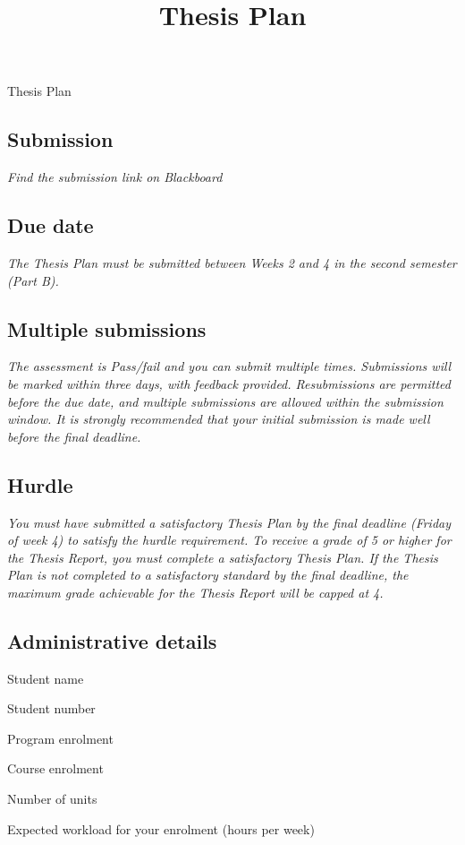 \documentclass[12pt,openany,a4paper]{book}
\newcommand{\purple}[1]{\textcolor{topicpurple}{\textit{#1}}}
\newcommand{\field}[1]{\noindent #1\par\vspace{1.2em}}
\begin{document}
\setlength{\parindent}{0pt}
\setlength{\parskip}{0.6em}

\title{Thesis Plan}
\date{}
\begingroup
{}
\setlength{\parindent}{0pt}
\setlength{\parskip}{0.5em}
\vspace*{-2.5em}
\begin{center}
{\LARGE Thesis Plan}
\end{center}
\vspace{-1.2em}
\endgroup


\subsection*{Submission}
\purple{Find the submission link on Blackboard}

\subsection*{Due date}
\purple{The Thesis Plan must be submitted between Weeks 2 and 4 in the second semester (Part B).}

\subsection*{Multiple submissions}
\purple{The assessment is Pass/fail and you can submit multiple times. Submissions will be marked within three days, with feedback provided. Resubmissions are permitted before the due date, and multiple submissions are allowed within the submission window. It is strongly recommended that your initial submission is made well before the final deadline.}

\subsection*{Hurdle}
\purple{You must have submitted a satisfactory Thesis Plan by the final deadline (Friday of week 4) to satisfy the hurdle requirement. To receive a grade of 5 or higher for the Thesis Report, you must complete a satisfactory Thesis Plan. If the Thesis Plan is not completed to a satisfactory standard by the final deadline, the maximum grade achievable for the Thesis Report will be capped at 4.}

\subsection*{Administrative details}
{\setlength{\parskip}{0pt}
\renewcommand{\field}[1]{\noindent #1\par\vspace{0.25em}}
\field{Student name}
\field{Student number}
\field{Program enrolment}
\field{Course enrolment}
\field{Number of units}
\field{Expected workload for your enrolment (hours per week)}
}
\end{document}
